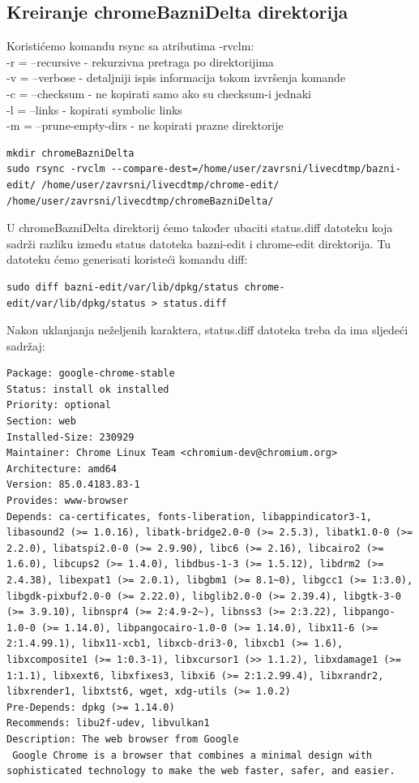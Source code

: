 \documentclass[12pt,vi]{mitthesis}
\begin{document}
\subsection*{Kreiranje chromeBazniDelta direktorija}
\indent
Koristićemo komandu rsync sa atributima -rvclm:\\
-r = --recursive - rekurzivna pretraga po direktorijima\\
-v = --verbose - detaljniji ispis informacija tokom izvršenja komande\\
-c = --checksum - ne kopirati samo ako su checksum-i jednaki\\
-l = --links - kopirati symbolic links\\
-m = --prune-empty-dirs - ne kopirati prazne direktorije\\
\begin{lstlisting}[style=BashInputStyle]
mkdir chromeBazniDelta
sudo rsync -rvclm --compare-dest=/home/user/zavrsni/livecdtmp/bazni-edit/ /home/user/zavrsni/livecdtmp/chrome-edit/ /home/user/zavrsni/livecdtmp/chromeBazniDelta/
\end{lstlisting}
\indent
U chromeBazniDelta direktorij ćemo također ubaciti status.diff datoteku koja sadrži razliku između status datoteka bazni-edit i chrome-edit direktorija. Tu datoteku ćemo generisati koristeći komandu diff:
\begin{lstlisting}[style=BashInputStyle]
sudo diff bazni-edit/var/lib/dpkg/status chrome-edit/var/lib/dpkg/status > status.diff
\end{lstlisting}
Nakon uklanjanja neželjenih karaktera, status.diff datoteka treba da ima sljedeći sadržaj:
\begin{lstlisting}[style=BashInputStyle]
Package: google-chrome-stable
Status: install ok installed
Priority: optional
Section: web
Installed-Size: 230929
Maintainer: Chrome Linux Team <chromium-dev@chromium.org>
Architecture: amd64
Version: 85.0.4183.83-1
Provides: www-browser
Depends: ca-certificates, fonts-liberation, libappindicator3-1, libasound2 (>= 1.0.16), libatk-bridge2.0-0 (>= 2.5.3), libatk1.0-0 (>= 2.2.0), libatspi2.0-0 (>= 2.9.90), libc6 (>= 2.16), libcairo2 (>= 1.6.0), libcups2 (>= 1.4.0), libdbus-1-3 (>= 1.5.12), libdrm2 (>= 2.4.38), libexpat1 (>= 2.0.1), libgbm1 (>= 8.1~0), libgcc1 (>= 1:3.0), libgdk-pixbuf2.0-0 (>= 2.22.0), libglib2.0-0 (>= 2.39.4), libgtk-3-0 (>= 3.9.10), libnspr4 (>= 2:4.9-2~), libnss3 (>= 2:3.22), libpango-1.0-0 (>= 1.14.0), libpangocairo-1.0-0 (>= 1.14.0), libx11-6 (>= 2:1.4.99.1), libx11-xcb1, libxcb-dri3-0, libxcb1 (>= 1.6), libxcomposite1 (>= 1:0.3-1), libxcursor1 (>> 1.1.2), libxdamage1 (>= 1:1.1), libxext6, libxfixes3, libxi6 (>= 2:1.2.99.4), libxrandr2, libxrender1, libxtst6, wget, xdg-utils (>= 1.0.2)
Pre-Depends: dpkg (>= 1.14.0)
Recommends: libu2f-udev, libvulkan1
Description: The web browser from Google
 Google Chrome is a browser that combines a minimal design with sophisticated technology to make the web faster, safer, and easier.
\end{lstlisting}
\end{document}
